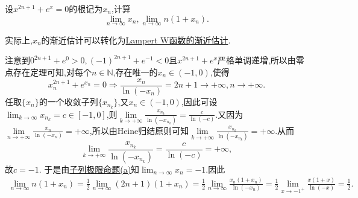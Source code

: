 \documentclass[../../main.tex]{subfiles}%
\begin{document}
\begin{example}
设\(x^{2n + 1}+e^{x}=0\)的根记为\(x_n\),计算
\[
\lim_{n\rightarrow\infty}x_n,\lim_{n\rightarrow\infty}n(1 + x_n).
\]
\end{example}
\begin{note}
实际上,$x_n$的渐近估计可以转化为\hyperref[proposition:Lampert W 函数的渐近估计]{Lampert W函数的渐近估计}.
\end{note}
\begin{solution}

注意到\(0^{2n + 1}+e^{0}>0,(-1)^{2n + 1}+e^{-1}<0\)且\(x^{2n + 1}+e^{x}\)严格单调递增,所以由零点存在定理可知,对每个\(n\in\mathbb{N}\),存在唯一的\(x_n\in(-1,0)\),使得
\[
x_n^{2n + 1}+e^{x_n}=0\Rightarrow\frac{x_n}{\ln(-x_n)} = 2n + 1\rightarrow +\infty,n\to +\infty.
\]
任取$\{x_n\}$的一个收敛子列$\{x_{n_k}\}$,又$x_n\in(-1,0)$,因此可设\(\lim_{k\rightarrow\infty}x_{n_k}=c\in[-1,0]\),则$\underset{k\rightarrow +\infty}{\lim}\frac{x_{n_k}}{\ln \left( -x_{n_k} \right)}=\frac{c}{\ln \left( -c \right)}$.又因为$\underset{n\rightarrow +\infty}{\lim}\frac{x_n}{\ln \left( -x_n \right)}=+\infty$,所以由Heine归结原则可知$\underset{k\rightarrow +\infty}{\lim}\frac{x_{n_k}}{\ln \left( -x_{n_k} \right)}=+\infty$.从而
\[
\underset{k\rightarrow +\infty}{\lim}\frac{x_{n_k}}{\ln \left( -x_{n_k} \right)}=\frac{c}{\ln(-c)}=+\infty,
\]
故$c = - 1$.
于是由\hyperref[proposition:子列极限命题]{子列极限命题(a)}知\(\lim_{n\rightarrow\infty}x_n=-1\).因此
\begin{align*}
\lim_{n\rightarrow\infty}n(1 + x_n)=\frac{1}{2}\lim_{n\rightarrow\infty}(2n + 1)(1 + x_n)
=\frac{1}{2}\lim_{n\rightarrow\infty}\frac{x_n(1 + x_n)}{\ln(-x_n)}
=\frac{1}{2}\lim_{x\rightarrow - 1^+}\frac{x(1 + x)}{\ln(-x)}
=\frac{1}{2}.
\end{align*}

\end{solution}
\end{document}
